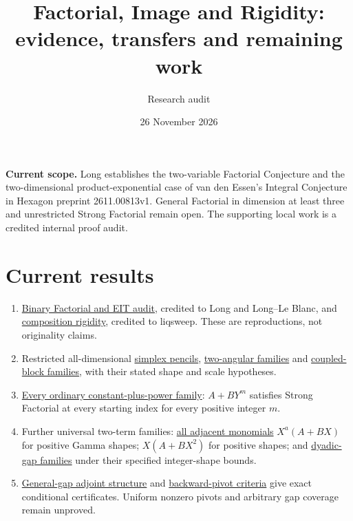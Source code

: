 \documentclass[11pt]{article}
\title{Factorial, Image and Rigidity: evidence, transfers and remaining work}
\author{Research audit}
\date{26 November 2026}
\begin{document}
\maketitle


\noindent\textbf{Current scope.}
Long establishes the two-variable Factorial Conjecture and the
two-dimensional product-exponential case of van den Essen's Integral
Conjecture in Hexagon preprint 2611.00813v1. General Factorial in dimension
at least three and unrestricted Strong Factorial remain open. The
supporting local work is a credited internal proof audit.

\section*{Current results}
\begin{enumerate}
\item \href{LONG_EIT_AND_FC2_AUDIT.tex}{Binary Factorial and EIT audit},
credited to Long and Long--Le Blanc, and
\href{RIGIDITY_CRITICAL_VALUES.tex}{composition rigidity}, credited to
liqsweep. These are reproductions, not originality claims.
\item Restricted all-dimensional
\href{SIMPLEX_PENCILS_AND_AFFINE_LIMITS.tex}{simplex pencils},
\href{TWO_ANGULAR_COORDINATES.tex}{two-angular families} and
\href{COUPLED_BLOCK_PERIODS.tex}{coupled-block families}, with their stated
shape and scale hypotheses.
\item \href{ALL_UNIVARIATE_TWO_TERM_SFC.tex}{Every ordinary
constant-plus-power family}: $A+BY^m$ satisfies Strong Factorial at every
starting index for every positive integer $m$.
\item Further universal two-term families:
\href{UNIFORM_PADE_PARABOLA_SFC.tex}{all adjacent monomials}
$X^a(A+BX)$ for positive Gamma shapes;
\href{CUBIC_ADJOINT_STABILITY_SFC.tex}{$X(A+BX^2)$} for positive shapes;
and \href{DYADIC_BINOMIAL_SFC.tex}{dyadic-gap families} under their
specified integer-shape bounds.
\item \href{HIGHER_GAP_ADJOINT_RANK.tex}{General-gap adjoint structure}
and \href{GAP_THREE_POLAR_AND_CONTINUANT.tex}{backward-pivot criteria}
give exact conditional certificates. Uniform nonzero pivots and arbitrary
gap coverage remain unproved.
\end{enumerate}
\end{document}
